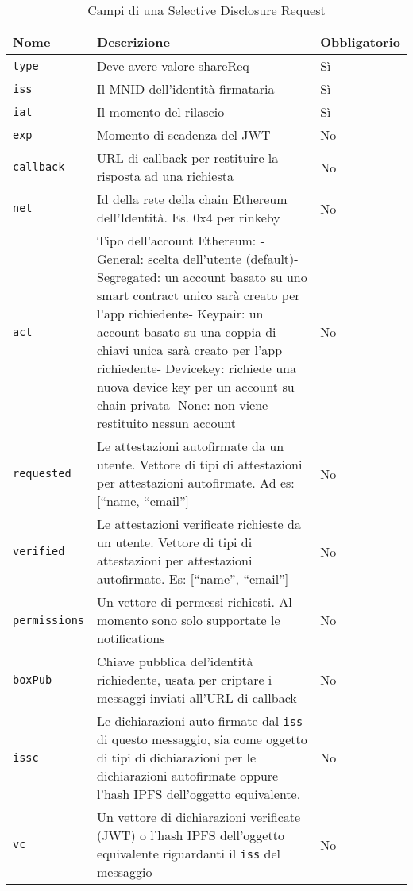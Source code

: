 \begin{table}[htbp]
    \centering
      \begin{tabular}{p{6.165em}p{19.89em}p{6.335em}}
      \toprule
      \textbf{Nome} & \textbf{Descrizione} & \textbf{Obbligatorio} \\
      \midrule
      \texttt{type} & Deve avere valore shareReq & Sì \\
      \midrule
      \texttt{iss} & Il MNID dell’identità firmataria & Sì \\
      \midrule
      \texttt{iat} & Il momento del rilascio & Sì \\
      \midrule
      \texttt{exp} & Momento di scadenza del JWT & No \\
      \midrule
      \texttt{callback} & URL di callback per restituire la risposta ad una richiesta & No \\
      \midrule
      \texttt{net} & Id della rete della chain Ethereum dell’Identità. Es. 0x4 per rinkeby & No \\
      \midrule
      \texttt{act} & Tipo dell’account Ethereum: \newline{}- General: scelta dell’utente (default)\newline{}- Segregated: un account basato su uno smart contract unico sarà creato per l’app richiedente\newline{}- Keypair: un account basato su una coppia di chiavi unica sarà creato per l’app richiedente\newline{}- Devicekey: richiede una nuova device key per un account su chain privata\newline{}- None: non viene restituito nessun account & No \\
      \midrule
      \texttt{requested} & Le attestazioni autofirmate da un utente. Vettore di tipi di attestazioni\newline{} per attestazioni autofirmate. Ad es: [“name, “email”] & No \\
      \midrule
      \texttt{verified} & Le attestazioni verificate richieste da un utente. Vettore di tipi di attestazioni per attestazioni autofirmate. Es: [“name”, “email”] & No \\
      \midrule
      \texttt{permissions} & Un vettore di permessi richiesti. Al momento sono solo supportate le notifications & No \\
      \midrule
      \texttt{boxPub} & Chiave pubblica del'identità richiedente, usata per criptare i messaggi inviati all'URL di callback & No \\
      \midrule
      \texttt{issc} & Le dichiarazioni auto firmate dal \texttt{iss} di questo messaggio, sia come oggetto di tipi di dichiarazioni
      per le dichiarazioni autofirmate oppure l'hash IPFS dell'oggetto equivalente. & No \\
      \midrule
      \texttt{vc} & Un vettore di dichiarazioni verificate (JWT) o l'hash IPFS dell'oggetto equivalente riguardanti
      il \texttt{iss} del messaggio  & No \\
      \bottomrule
      \end{tabular}%
    \label{tab:selectivedisclosurerequest}%
    \caption{Campi di una Selective Disclosure Request}
  \end{table}%

